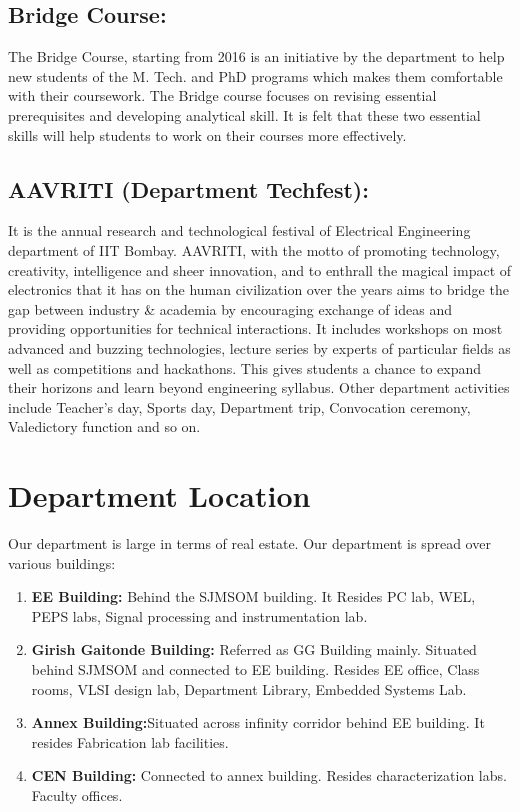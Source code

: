 \documentclass[11pt,openany]{book} %
\begin{document}
\section {Bridge Course:}
The Bridge Course, starting from 2016 is an initiative by the department to help new students of the M. Tech. and PhD programs which makes them comfortable with their coursework. The Bridge course focuses on revising essential prerequisites and developing analytical skill. It is felt that these two essential skills will help students to work on their courses more effectively.\newline
\section {AAVRITI (Department Techfest):}
It is the annual research and technological festival of Electrical Engineering department of IIT Bombay. AAVRITI, with the motto of promoting technology, creativity, intelligence and sheer innovation, and to enthrall the magical impact of electronics that it has on the human civilization over the years aims to bridge the gap between industry \& academia by encouraging exchange of ideas and providing opportunities for technical interactions.\newline
It includes workshops on most advanced and buzzing technologies, lecture series by experts of particular fields as well as competitions and hackathons. This gives students a chance to expand their horizons and learn beyond engineering syllabus.\newline
Other department activities include Teacher’s day, Sports day, Department trip, Convocation ceremony, Valedictory function and so on.
\chapter{Department Location }
Our department is large in terms of real estate. Our department is spread over various buildings: \newline
\begin{enumerate}
    \item  \textbf{EE Building:} \newline  Behind the SJMSOM building. It Resides PC lab, WEL, PEPS labs, Signal processing and instrumentation lab.
    \item  \textbf{Girish Gaitonde Building:} \newline Referred as GG Building mainly. Situated behind SJMSOM and connected to EE building. Resides EE office, Class rooms, VLSI design lab, Department Library, Embedded Systems Lab.
    \item \textbf{Annex Building:}\newline  Situated across infinity corridor behind EE building. It resides Fabrication lab facilities.
    \item \textbf{CEN Building:} \newline Connected to annex building. Resides characterization labs. Faculty offices.
\end{enumerate}
\end{document}
